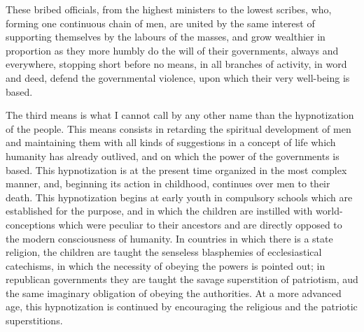 \documentclass{book}
\begin{document}
These bribed officials, from the highest ministers to the lowest scribes, who, forming one continuous chain of men, are united by the same interest of supporting themselves by the labours of the masses, and grow wealthier in proportion as they more humbly do the will of their governments, always and everywhere, stopping short before no means, in all branches of activity, in word and deed, defend the governmental violence, upon which their very well-being is based.

The third means is what I cannot call by any other name than the hypnotization of the people. This means consists in retarding the spiritual development of men and maintaining them with all kinds of suggestions in a concept of life which humanity has already outlived, and on which the power of the governments is based. This hypnotization is at the present time organized in the most complex manner, and, beginning its action in childhood, continues over men to their death. This hypnotization begins at early youth in compulsory schools which are established for the purpose, and in which the children are instilled with world-conceptions which were peculiar to their ancestors and are directly opposed to the modern consciousness of humanity. In countries in which there is a state religion, the children are taught the senseless blasphemies of ecclesiastical catechisms, in which the necessity of obeying the powers is pointed out; in republican governments they are taught the savage superstition of patriotism, aud the same imaginary obligation of obeying the authorities. At a more advanced age, this hypnotization is continued by encouraging the religious and the patriotic superstitions.
\end{document}
